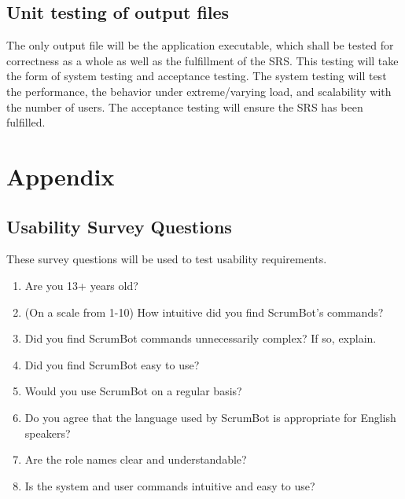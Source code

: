\documentclass[12pt, titlepage]{article}
\begin{document}
\subsection{Unit testing of output files}		
The only output file will be the application executable, which shall be tested for correctness as a whole as well as the fulfillment of the SRS. This testing will take the form of system testing and acceptance testing. The system testing will test the performance, the behavior under extreme/varying load, and scalability with the number of users. The acceptance testing will ensure the SRS has been fulfilled.



\newpage

\section{Appendix}


\subsection{Usability Survey Questions}
These survey questions will be used to test usability requirements.
\begin{enumerate}
    \item Are you 13+ years old?
    \item (On a scale from 1-10) How intuitive did you find ScrumBot's commands?
    \item Did you find ScrumBot commands unnecessarily complex? If so, explain.
    \item Did you find ScrumBot easy to use?
    \item Would you use ScrumBot on a regular basis?
    \item Do you agree that the language used by ScrumBot is appropriate for English speakers?
    \item Are the role names clear and understandable?
    \item Is the system and user commands intuitive and easy to use?
\end{enumerate}
\end{document}

